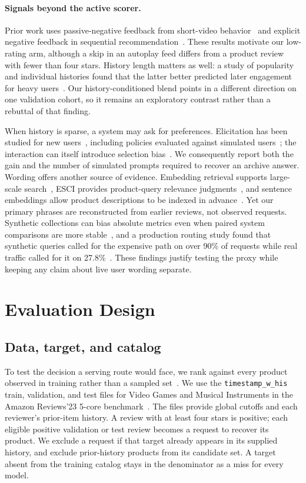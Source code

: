 \documentclass[11pt]{article}
\begin{document}
\paragraph{Signals beyond the active scorer.}
Prior work uses passive-negative feedback from short-video behavior~\cite{pan2023sine} and explicit negative feedback in sequential recommendation~\cite{wang2023negative}. These results motivate our low-rating arm, although a skip in an autoplay feed differs from a product review with fewer than four stars. History length matters as well: a study of popularity and individual histories found that the latter better predicted later engagement for heavy users~\cite{ji2020popularity}. Our history-conditioned blend points in a different direction on one validation cohort, so it remains an exploratory contrast rather than a rebuttal of that finding.

When history is sparse, a system may ask for preferences. Elicitation has been studied for new users~\cite{rashid2008preferences}, including policies evaluated against simulated users~\cite{hsu2024minimizing}; the interaction can itself introduce selection bias~\cite{gupta2024selection}. We consequently report both the gain and the number of simulated prompts required to recover an archive answer. Wording offers another source of evidence. Embedding retrieval supports large-scale search~\cite{huang2020ebr}, ESCI provides product-query relevance judgments~\cite{reddy2022esci}, and sentence embeddings allow product descriptions to be indexed in advance~\cite{reimers2019sbert}. Yet our primary phrases are reconstructed from earlier reviews, not observed requests. Synthetic collections can bias absolute metrics even when paired system comparisons are more stable~\cite{rahmani2024synthetic,rahmani2025bias}, and a production routing study found that synthetic queries called for the expensive path on over 90\% of requests while real traffic called for it on 27.8\%~\cite{hussain2026coverage}. These findings justify testing the proxy while keeping any claim about live user wording separate.

\section{Evaluation Design}
\subsection{Data, target, and catalog}
To test the decision a serving route would face, we rank against every product observed in training rather than a sampled set~\cite{hidasi2023flaws}. We use the \texttt{timestamp\_w\_his} train, validation, and test files for Video Games and Musical Instruments in the Amazon Reviews'23 5-core benchmark~\cite{amazon5core}. The files provide global cutoffs and each reviewer's prior-item history. A review with at least four stars is positive; each eligible positive validation or test review becomes a request to recover its product. We exclude a request if that target already appears in its supplied history, and exclude prior-history products from its candidate set. A target absent from the training catalog stays in the denominator as a miss for every model.
\end{document}
